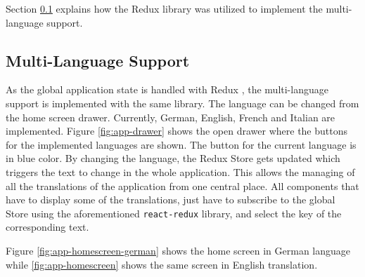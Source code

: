 Section \ref{sec:milti-language} explains how the Redux library was utilized to implement the multi-language support.

\subsection{Multi-Language Support}\label{sec:milti-language}

As the global application state is handled with Redux \cite{redux}, the multi-language support is implemented with the same library. The language can be changed from the home screen drawer. Currently, German, English, French and Italian are implemented. Figure \ref{fig:app-drawer} shows the open drawer where the buttons for the implemented languages are shown. The button for the current language is in blue color. By changing the language, the Redux Store gets updated which triggers the text to change in the whole application. This allows the managing of all the translations of the application from one central place. All components that have to display some of the translations, just have to subscribe to the global Store using the aforementioned \texttt{react-redux} library, and select the key of the corresponding text.

Figure \ref{fig:app-homescreen-german} shows the home screen in German language while \ref{fig:app-homescreen} shows the same screen in English translation. 

